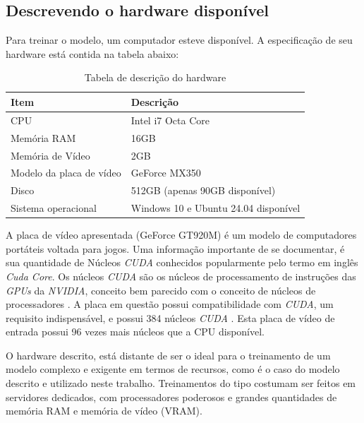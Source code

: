 \subsection{Descrevendo o hardware disponível}

Para treinar o modelo, um computador esteve disponível. A especificação de seu hardware está contida na tabela abaixo:

\begin{table}[H]
    \centering
    \caption{Tabela de descrição do hardware}
    \begin{tabular}{|l|l|} \hline
        \textbf{Item}            & \textbf{Descrição}                    \\ \hline
        CPU                      & Intel i7 Octa Core                    \\ \hline
        Memória RAM              & 16GB                                  \\ \hline
        Memória de Vídeo         & 2GB                                   \\ \hline
        Modelo da placa de vídeo & GeForce MX350                         \\ \hline
        Disco                    & 512GB (apenas 90GB disponível)        \\ \hline
        Sistema operacional      & Windows 10 e Ubuntu 24.04 disponível  \\ \hline
    \end{tabular}
    \vspace{0.3cm}
    \label{tab:my_label}
\end{table}

A placa de vídeo apresentada (GeForce GT920M) é um modelo de computadores portáteis voltada para jogos. Uma informação importante de se documentar, é sua quantidade de Núcleos \textit{CUDA} conhecidos popularmente pelo termo em inglês \textit{Cuda Core}. Os núcleos \textit{CUDA} são os núcleos de processamento de instruções das \textit{GPUs} da \textit{NVIDIA}, conceito bem parecido com o conceito de núcleos de processadores \cite{ryles_what_2022}. A placa em questão possui compatibilidade com \textit{CUDA}, um requisito indispensável, e possui 384 núcleos \textit{CUDA} \cite{nvidia_geforce_2022, technical_city_nvidia_2022}. Esta placa de vídeo de entrada possui 96 vezes mais núcleos que a CPU disponível.

O hardware descrito, está distante de ser o ideal para o treinamento de um modelo complexo e exigente em termos de recursos, como é o caso do modelo descrito e utilizado neste trabalho. Treinamentos do tipo costumam ser feitos em servidores dedicados, com processadores poderosos e grandes quantidades de memória RAM e memória de vídeo (VRAM).

